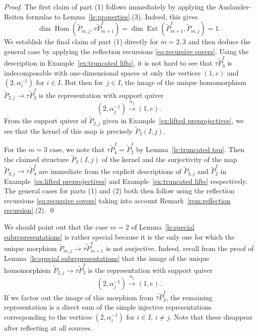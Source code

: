 \documentclass[smallextended,envcountsect,envcountsame]{svjour3}
\numberwithin{equation}{section}
\newcommand{\Ext}{\operatorname{Ext}}
\newcommand{\Hom}{\operatorname{Hom}}
\begin{document}
\begin{proof}
  The first claim of part (1) follows immediately by applying the Auslander-Reiten formulas \cite[Theorem IV.2.13]{ass} to Lemma~\ref{le:properties}.(3).
  Indeed, this gives
  \[\dim\Hom(\tilde P_{m,j},\tau\tilde P_{m+1}^I)=\dim\Ext(\tilde P_{m+1}^I,\tilde P_{m,j})=1.\]
  We establish the final claim of part (1) directly for $m=2,3$ and then deduce the general case by applying the reflection recursions \eqref{eq:recursive covers}.
  Using the description in Example~\ref{ex:truncated lifts}, it is not hard to see that $\tau\tilde P_3^I$ is indecomposable with one-dimensional spaces at only the vertices $(1,e)$ and $(2,\alpha_i^{-1})$ for $i\in I$.
  But then for~$j\in I$, the image of the unique homomorphism $\tilde P_{2,j}\to\tau\tilde P_3^I$ is the representation with support quiver
  \[(2,\alpha_j^{-1})\xrightarrow{\alpha_j}(1,e).\]
  From the support quiver of $\tilde P_{2,j}$ given in Example~\ref{ex:lifted preprojectives}, we see that the kernel of this map is precisely $\tilde P_2(I,j)$.

  For the $m=3$ case, we note that $\tau\tilde P_4^I=\tilde P_2^I$ by Lemma~\ref{le:truncated tau}.
  Then the claimed structure $\tilde P_3(I,j)$ of the kernel and the surjectivity of the map $\tilde P_{3,j}\to\tau\tilde P_4^I$ are immediate from the explicit descriptions of $\tilde P_{3,j}$ and $\tilde P_2^I$ in Example~\ref{ex:lifted preprojectives} and Example~\ref{ex:truncated lifts} respectively.
  The general cases for parts (1) and (2) both then follow using the reflection recursions \eqref{eq:recursive covers} taking into account Remark~\ref{rem:reflection recursion}.(2).
\qed\end{proof}

\begin{remark}
  \label{rem:special case}
  We should point out that the case $m=2$ of Lemma~\ref{le:special subrepresentations} is rather special because it is the only one for which the unique morphism $\tilde P_{m,j}\to\tau\tilde P_{m+1}^I$ is not surjective.
  Indeed, recall from the proof of Lemma~\ref{le:special subrepresentations} that the image of the unique homomorphism $\tilde P_{2,j}\to\tau\tilde P_3^I$ is the representation with support quiver
  \begin{equation}
    \label{eq:special case}
    (2,\alpha_j^{-1})\xrightarrow{\alpha_j}(1,e).
  \end{equation}
  If we factor out the image of this morphism from $\tau\tilde P_3^I$, the remaining representation is a direct sum of the simple injective representations corresponding to the vertices $(2,\alpha_i^{-1})$ for $i\in I$, $i\ne j$.
  Note that these disappear after reflecting at all sources.
\end{remark}
\end{document}
